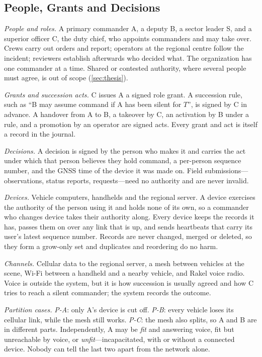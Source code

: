 \subsection{People, Grants and Decisions}
\label{sec:system-model}

\textit{People and roles.} A primary commander A, a deputy B, a sector leader S, and a
superior officer C, the duty chief, who appoints commanders and may take over. Crews carry
out orders and report; operators at the regional centre follow the incident; reviewers
establish afterwards who decided what. The organization has one commander at a time.
Shared or contested authority, where several people must agree, is out of scope
(\cref{sec:thesis}).

\textit{Grants and succession acts.} C issues A a signed role grant. A succession rule, such
as ``B may assume command if A has been silent for $T$'', is signed by C in advance. A
handover from A to B, a takeover by C, an activation by B under a rule, and a promotion by an
operator are signed acts. Every grant and act is itself a record in the journal.

\textit{Decisions.} A decision is signed by the person who makes it and carries the act
under which that person believes they hold command, a per-person sequence number, and the
GNSS time of the device it was made on. Field submissions---observations, status reports,
requests---need no authority and are never invalid.

\textit{Devices.} Vehicle computers, handhelds and the regional server. A device exercises
the authority of the person using it and holds none of its own, so a commander who changes
device takes their authority along. Every device keeps the records it has, passes them on
over any link that is up, and sends heartbeats that carry its user's latest sequence
number. Records are never changed, merged or deleted, so they form a grow-only set and
duplicates and reordering do no harm.

\textit{Channels.} Cellular data to the regional server, a mesh between vehicles at the
scene, Wi-Fi between a handheld and a nearby vehicle, and Rakel voice radio. Voice is
outside the system, but it is how succession is usually agreed and how C tries to reach a
silent commander; the system records the outcome.

\textit{Partition cases.} \emph{P-A}: only A's device is cut off. \emph{P-B}: every vehicle
loses its cellular link, while the mesh still works. \emph{P-C}: the mesh also splits, so A
and B are in different parts. Independently, A may be \emph{fit} and answering voice, fit
but unreachable by voice, or \emph{unfit}---incapacitated, with or without a connected
device. Nobody can tell the last two apart from the network alone.

